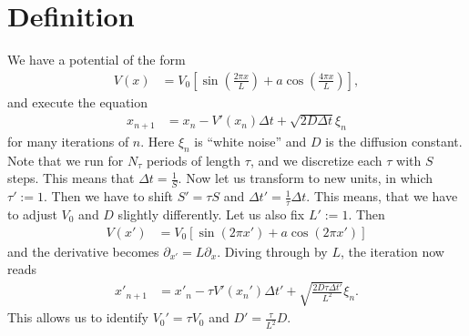 \documentclass[english, parskip=full]{scrartcl}
\title{\titel}
\author{\autor}
\date{\today}
\newcommand{\kla}{}
\newcommand{\klam}{}
\begin{document}
\maketitle  %

\section{Definition}
We have a potential of the form 
\begin{align}
V(x) &= V_0 \klam\left[ \sin\kla\left( \frac{2\pi x}{L} \right) + a\cos\kla\left( \frac{4\pi x}{L} \right) \right],
\end{align}
and execute the equation
\begin{align}
x_{n+1} &= x_n - V'(x_n) \Delta t + \sqrt{2D\Delta t} \xi_n
\end{align}
for many iterations of $n$.
Here $\xi_n$ is ``white noise'' and $D$ is the diffusion constant.
Note that we run for $N_\tau$ periods of length $\tau$, and we discretize each $\tau$ with $S$ steps.
This means that $\Delta t = \frac{1}{S}$.
Now let us transform to new units, in which $\tau' := 1$. 
Then we have to shift $S' = \tau S$ and $\Delta t' = \frac{1}{\tau} \Delta t$.
This means, that we have to adjust $V_0$ and $D$ slightly differently.
Let us also fix $L' := 1$.
Then
\begin{align}
V(x') &= V_0 \klam\left[ \sin (2\pi x') + a\cos (2\pi x') \right]
\end{align}
and the derivative becomes $\partial_{x'} = L\partial_x$.
Diving through by $L$, the iteration now reads
\begin{align}
x'_{n+1} &= x'_n - \tau V'(x_n') \Delta t' + \sqrt{\frac{2D\tau\Delta t'}{L^2}} \xi_n.
\end{align}
This allows us to identify $V_0' = \tau V_0$ and $D' = \frac{\tau}{L^2} D$.

\end{document}
